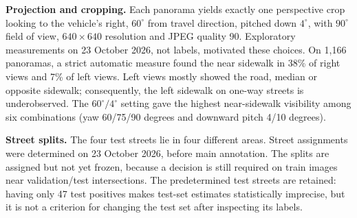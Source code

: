 \textbf{Projection and cropping.} Each panorama yields exactly one perspective crop looking to the vehicle's right, $60^\circ$ from travel direction, pitched down $4^\circ$, with $90^\circ$ field of view, $640\times640$ resolution and JPEG quality 90. Exploratory measurements on 23 October 2026, not labels, motivated these choices. On 1,166 panoramas, a strict automatic measure found the near sidewalk in 38\% of right views and 7\% of left views. Left views mostly showed the road, median or opposite sidewalk; consequently, the left sidewalk on one-way streets is underobserved. The $60^\circ/4^\circ$ setting gave the highest near-sidewalk visibility among six combinations (yaw 60/75/90 degrees and downward pitch 4/10 degrees).

\textbf{Street splits.} The four test streets lie in four different areas. Street assignments were determined on 23 October 2026, before main annotation. The splits are assigned but not yet frozen, because a decision is still required on train images near validation/test intersections. The predetermined test streets are retained: having only 47 test positives makes test-set estimates statistically imprecise, but it is not a criterion for changing the test set after inspecting its labels.


